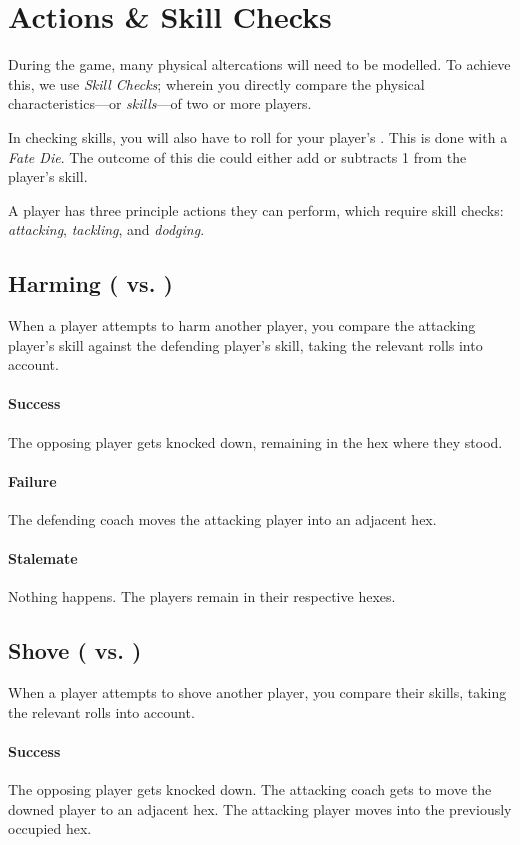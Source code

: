 \section{Actions \& Skill Checks}\label{skill-checks}
During the game, many physical altercations will need to be modelled.
To achieve this, we use \textit{Skill Checks}; wherein you directly compare the physical characteristics---or \textit{skills}---of two or more players.

In checking skills, you will also have to roll for your player's \fate{}.
This is done with a \textit{Fate Die}.
The outcome of this die could either add or subtracts 1 from the player's skill.

A player has three principle actions they can perform, which require skill checks: \textit{attacking}, \textit{tackling}, and \textit{dodging}.

\subsection{Harming (\fight{} vs. \flight{})}
When a player attempts to harm another player, you compare the attacking player's \fight{} skill against the defending player's \flight{} skill, taking the relevant \fate{} rolls into account.

\paragraph{Success}
The opposing player gets knocked down, remaining in the hex where they stood.
\paragraph{Failure}
The defending coach moves the attacking player into an adjacent hex.
\paragraph{Stalemate}
Nothing happens.
The players remain in their respective hexes.

\subsection{Shove (\fight{} vs. \fight{})}
When a player attempts to shove another player, you compare their \fight{} skills, taking the relevant \fate{} rolls into account.

\paragraph{Success} 
The opposing player gets knocked down. 
The attacking coach gets to move the downed player to an adjacent hex.
The attacking player moves into the previously occupied hex.

